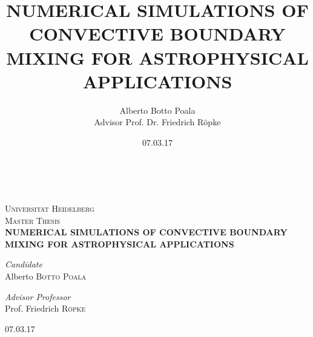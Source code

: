 \documentclass[12pt]{book}
\title{NUMERICAL SIMULATIONS OF CONVECTIVE BOUNDARY MIXING FOR ASTROPHYSICAL APPLICATIONS}
\author{Alberto Botto Poala\\
Advisor Prof. Dr. Friedrich Röpke}
\date{07.03.17}
\numberwithin{equation}{section}
\begin{document}
\renewcommand{\arraystretch}{1.2}
\prntlen{\textwidth} \\
\the\textwidth
\begin{titlepage}
\begin{center}


\textsc{\LARGE Universität Heidelberg}\\[1.8cm]

\textsc{\Large Master Thesis}\\[0.5cm]


{ \huge \bfseries NUMERICAL SIMULATIONS OF CONVECTIVE BOUNDARY MIXING FOR ASTROPHYSICAL APPLICATIONS \\[0.5cm] }



\begin{minipage}{0.4\textwidth}
\begin{flushleft} \large
\emph{Candidate}\\
Alberto \textsc{Botto Poala}
\end{flushleft}
\end{minipage}
\begin{minipage}{0.4\textwidth}
\begin{flushright} \large
\emph{Advisor Professor} \\
Prof. Friedrich \textsc{Röpke}
\end{flushright}
\end{minipage}

\vfill

{07.03.17}

\end{center}
\end{titlepage}

\tableofcontents
\maketitle







\end{document}
